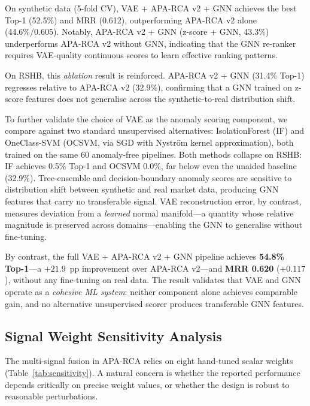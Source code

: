 \documentclass{article}
\newcommand{\aparca}{\textsc{APA-RCA}}
\begin{document}
On synthetic data (5-fold CV), VAE + \aparca{} v2 + GNN achieves the best
Top-1 (52.5\%) and MRR (0.612), outperforming \aparca{} v2 alone (44.6\%/0.605).
Notably, \aparca{} v2 + GNN (z-score + GNN, 43.3\%) underperforms
\aparca{} v2 without GNN, indicating that the GNN re-ranker requires
VAE-quality continuous scores to learn effective ranking patterns.

On RSHB, this \emph{ablation} result is reinforced.
\aparca{} v2 + GNN (31.4\% Top-1) regresses relative to \aparca{} v2 (32.9\%),
confirming that a GNN trained on z-score features does not generalise
across the synthetic-to-real distribution shift.

To further validate the choice of VAE as the anomaly scoring component,
we compare against two standard unsupervised alternatives:
IsolationForest (IF) and OneClass-SVM (OCSVM, via SGD with Nystr\"{o}m kernel approximation),
both trained on the same 60 anomaly-free pipelines.
Both methods collapse on RSHB: IF achieves 0.5\% Top-1 and OCSVM 0.0\%,
far below even the unaided baseline (32.9\%).
Tree-ensemble and decision-boundary anomaly scores are sensitive to distribution shift
between synthetic and real market data, producing GNN features that carry
no transferable signal.
VAE reconstruction error, by contrast, measures deviation from a
\emph{learned} normal manifold---a quantity whose relative magnitude is preserved
across domains---enabling the GNN to generalise without fine-tuning.

By contrast, the full VAE + \aparca{} v2 + GNN pipeline achieves
\textbf{54.8\% Top-1}---a $+21.9$~pp improvement over \aparca{} v2---and
\textbf{MRR 0.620} ($+0.117$), without any fine-tuning on real data.
The result validates that VAE and GNN operate as a \emph{cohesive ML system}:
neither component alone achieves comparable gain, and no alternative
unsupervised scorer produces transferable GNN features.

\subsection{Signal Weight Sensitivity Analysis}
\label{sec:sensitivity}

The multi-signal fusion in \aparca{} relies on eight hand-tuned scalar weights
(Table~\ref{tab:sensitivity}).
A natural concern is whether the reported performance depends critically on
precise weight values, or whether the design is robust to reasonable perturbations.
\end{document}
